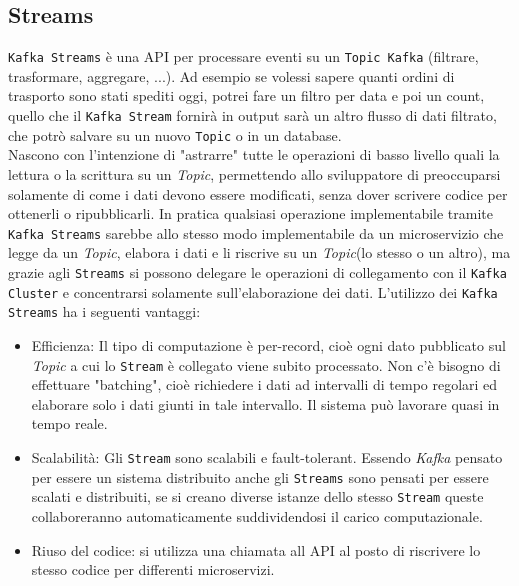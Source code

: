 \subsection{Streams}
\label{subsec:kafka_streams}
\texttt{Kafka Streams} è una API per processare eventi su un \texttt{Topic Kafka} (filtrare, trasformare, aggregare, ...).
Ad esempio se volessi sapere quanti ordini di trasporto sono stati spediti oggi, potrei fare un filtro per data e poi un count,
quello che il \texttt{Kafka Stream} fornirà in output sarà un altro flusso di dati filtrato, che potrò salvare su un nuovo \texttt{Topic} o in un database.\\
Nascono con l'intenzione di "astrarre" tutte le operazioni di basso livello quali la lettura o la scrittura su un \textit{Topic}, permettendo allo sviluppatore di preoccuparsi solamente di come i dati devono essere modificati, senza dover scrivere codice per ottenerli o ripubblicarli.
In pratica qualsiasi operazione implementabile tramite \texttt{Kafka Streams} sarebbe allo stesso modo implementabile da un microservizio che legge da un \textit{Topic}, elabora i dati e li riscrive su un \textit{Topic}(lo stesso o un altro), ma grazie agli \texttt{Streams} si possono delegare le operazioni di collegamento con il \texttt{Kafka Cluster} e concentrarsi solamente sull'elaborazione dei dati.
L'utilizzo dei \texttt{Kafka Streams} ha i seguenti vantaggi:
\begin{itemize}
    \item Efficienza: Il tipo di computazione è per-record, cioè ogni dato pubblicato sul \textit{Topic} a cui lo \texttt{Stream} è collegato viene subito processato. Non c'è bisogno di effettuare "batching", cioè richiedere i dati ad intervalli di tempo regolari ed elaborare solo i dati giunti in tale intervallo. Il sistema può lavorare quasi in tempo reale.  
    \item Scalabilità: Gli \texttt{Stream} sono scalabili e fault-tolerant. Essendo \textit{Kafka} pensato per essere un sistema distribuito anche gli \texttt{Streams} sono pensati per essere scalati e distribuiti, se si creano diverse istanze dello stesso \texttt{Stream} queste collaboreranno automaticamente suddividendosi il carico computazionale.
    \item Riuso del codice: si utilizza una chiamata all API al posto di riscrivere lo stesso codice per differenti microservizi.
\end{itemize}

